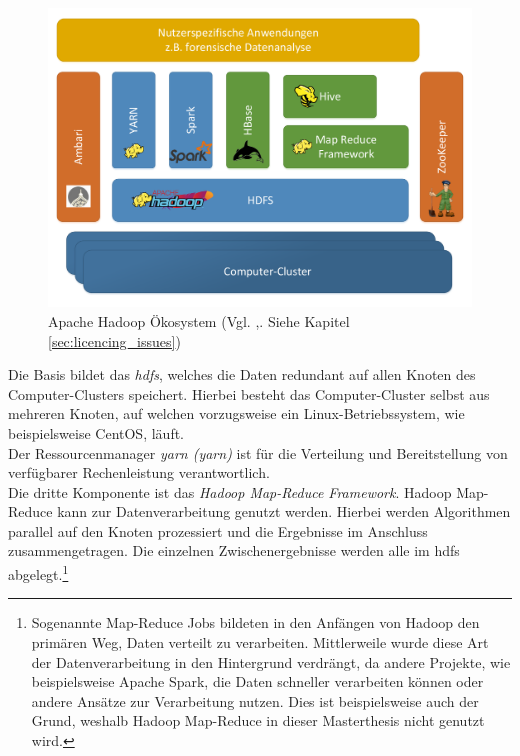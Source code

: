 \begin{figure}[ht]
  \centering
  \includegraphics[width=\textwidth]{./resource/hadoop_framework_structure.pdf}
  \caption{Apache Hadoop Ökosystem (Vgl. \cite{big_data_praxis},\cite{expert_hadoop_admin}. Siehe Kapitel \ref{sec:licencing_issues})}
  \label{fig:hadoop_framework_structure}
\end{figure}

\noindent
Die Basis bildet das \textit{\gls{hdfs}}, welches die Daten redundant auf allen Knoten des Computer-Clusters speichert. Hierbei besteht das Computer-Cluster selbst aus mehreren Knoten, auf welchen vorzugsweise ein Linux-Betriebssystem, wie beispielsweise CentOS, läuft.\\
Der Ressourcenmanager \textit{\acrshort{yarn} (\acrlong{yarn})} ist für die Verteilung und Bereitstellung von verfügbarer Rechenleistung verantwortlich.\\ 
Die dritte Komponente ist das \textit{Hadoop Map-Reduce Framework}. Hadoop Map-Reduce kann zur Datenverarbeitung genutzt werden. Hierbei werden Algorithmen parallel auf den Knoten prozessiert und die Ergebnisse im Anschluss zusammengetragen. Die einzelnen Zwischenergebnisse werden alle im \gls{hdfs} abgelegt.\footnote{Sogenannte Map-Reduce Jobs bildeten in den Anfängen von Hadoop den primären Weg, Daten verteilt zu verarbeiten. Mittlerweile wurde diese Art der Datenverarbeitung in den Hintergrund verdrängt, da andere Projekte, wie beispielsweise Apache Spark, die Daten schneller verarbeiten können oder andere Ansätze zur Verarbeitung nutzen. Dies ist beispielsweise auch der Grund, weshalb Hadoop Map-Reduce in dieser Masterthesis nicht genutzt wird.} \\

